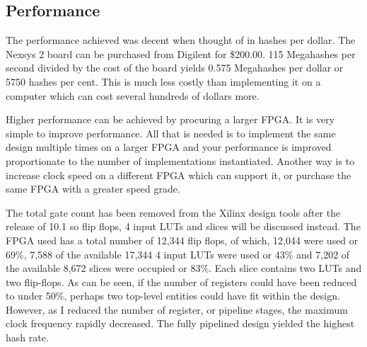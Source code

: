 	\subsection{Performance}
		The performance achieved was decent when thought of in hashes per dollar.  The Nexsys 2 board can be purchased from Digilent for \$200.00.  115 Megahashes per second divided by the cost of the board yields 0.575 Megahashes per dollar or 5750 hashes per cent.  This is much less costly than implementing it on a computer which can cost several hundreds of dollars more.  
		
		Higher performance can be achieved by procuring a larger FPGA.  It is very simple to improve performance.  All that is needed is to implement the same design multiple times on a larger FPGA and your performance is improved proportionate to the number of implementations instantiated.  Another way is to increase clock speed on a different FPGA which can support it, or purchase the same FPGA with a greater speed grade.
		
		The total gate count has been removed from the Xilinx design tools after the release of 10.1 so flip flops, 4 input LUTs and slices will be discussed instead.  The FPGA used has a total number of 12,344 flip flops, of which, 12,044 were used or 69\%,  7,588 of the available 17,344 4 input LUTs were used or 43\% and 7,202 of the available 8,672 slices were occupied or 83\%\cite{fpga}.  Each slice contains two LUTs and two flip-flops.  As can be seen, if the number of registers could have been reduced to under 50\%, perhaps two top-level entities could have fit within the design.  However, as I reduced the number of register, or pipeline stages, the maximum clock frequency rapidly decreased. The fully pipelined design yielded the  highest hash rate.
	

